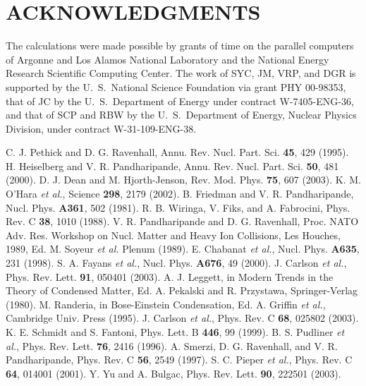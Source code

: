 \section{ACKNOWLEDGMENTS}

The calculations were made possible by grants of time
on the parallel computers of Argonne and Los Alamos National Laboratory and 
the National Energy Research Scientific Computing Center.  The work of SYC,
JM, VRP, and DGR is supported by the  U.~S.~National Science Foundation
via grant PHY 00-98353, that of JC by
the U.~S.~Department of Energy under contract W-7405-ENG-36, and that
of SCP and RBW by the U.~S.~Department of Energy, Nuclear Physics
Division, under contract W-31-109-ENG-38.


\begin{thebibliography}{9}
 C. J. Pethick and D. G. Ravenhall, Annu. Rev. Nucl. Part. Sci. {\bf 45}, 429 (1995). 
 H. Heiselberg and V. R. Pandharipande, Annu. Rev. Nucl. Part. Sci. {\bf 50}, 481 (2000). 
 D. J. Dean and M. Hjorth-Jenson, Rev. Mod. Phys. {\bf 75}, 607 (2003). 
 K. M. O'Hara {\em et al.}, Science {\bf 298}, 2179 (2002). 
 B. Friedman and V. R. Pandharipande, Nucl. Phys. {\bf A361}, 502 (1981). 
R. B. Wiringa, V. Fiks, and A. Fabrocini, Phys. Rev. C {\bf 38}, 1010 (1988). 
 V. R. Pandharipande and D. G. Ravenhall, Proc. NATO Adv. Res. Workshop on Nucl. 
             Matter and Heavy Ion Collisions, Les Houches, 1989, Ed. M. Soyeur {\em et al.}
             Plenum (1989). 
 E. Chabanat {\em et al.}, Nucl. Phys. {\bf A635}, 231 (1998). 
 S. A. Fayans {\em et al.}, Nucl. Phys. {\bf A676}, 49 (2000). 
 J. Carlson {\em et al.}, Phys. Rev. Lett. {\bf 91}, 050401 (2003). 
 A. J. Leggett, in Modern Trends in the Theory of Condensed Matter, 
                  Ed. A. Pekalski and R. Przystawa, Springer-Verlag (1980).  
 M. Randeria, in Bose-Einstein Condensation, Ed. A. Griffin {\em et al.}, 
                   Cambridge Univ. Press (1995). 
 J. Carlson {\em et al.}, Phys. Rev. C {\bf 68}, 025802 (2003). 
 K. E. Schmidt and S. Fantoni, Phys. Lett. B {\bf 446}, 99 (1999). 
 B. S. Pudliner {\em et al.}, Phys. Rev. Lett. {\bf 76}, 2416 (1996).   
 A. Smerzi, D. G. Ravenhall, and V. R. Pandharipande, Phys. Rev. C {\bf 56}, 2549 (1997). 
 S. C. Pieper {\em et al.}, Phys. Rev. C {\bf 64}, 014001 (2001). 
 Y. Yu and A. Bulgac, Phys. Rev. Lett. {\bf 90}, 222501 (2003).  

\end{thebibliography}


